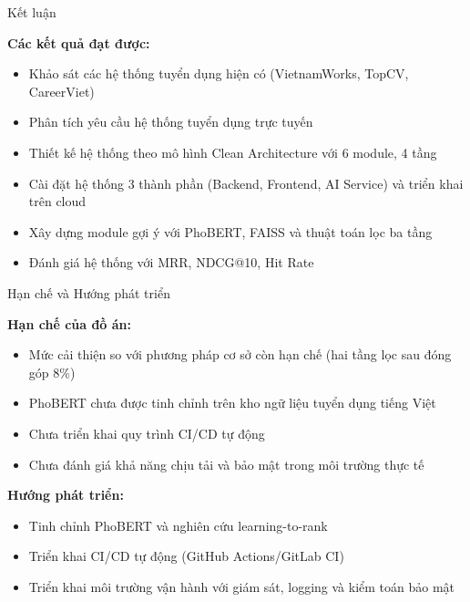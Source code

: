 \documentclass[aspectratio=169,xcolor=dvipsnames, t]{beamer}
\begin{document}
\begin{frame}{Kết luận}
\justifying

\textbf{Các kết quả đạt được:}

\begin{itemize}
    \item Khảo sát các hệ thống tuyển dụng hiện có (VietnamWorks, TopCV, CareerViet)

    \item Phân tích yêu cầu hệ thống tuyển dụng trực tuyến

    \item Thiết kế hệ thống theo mô hình Clean Architecture với 6 module, 4 tầng

    \item Cài đặt hệ thống 3 thành phần (Backend, Frontend, AI Service) và triển khai trên cloud

    \item Xây dựng module gợi ý với PhoBERT, FAISS và thuật toán lọc ba tầng

    \item Đánh giá hệ thống với MRR, NDCG@10, Hit Rate
\end{itemize}

\end{frame}

\begin{frame}{Hạn chế và Hướng phát triển}
\justifying

\textbf{Hạn chế của đồ án:}

\begin{itemize}
    \item Mức cải thiện so với phương pháp cơ sở còn hạn chế (hai tầng lọc sau đóng góp 8\%)

    \item PhoBERT chưa được tinh chỉnh trên kho ngữ liệu tuyển dụng tiếng Việt

    \item Chưa triển khai quy trình CI/CD tự động

    \item Chưa đánh giá khả năng chịu tải và bảo mật trong môi trường thực tế
\end{itemize}

\vspace{0.3cm}
\textbf{Hướng phát triển:}

\begin{itemize}
    \item Tinh chỉnh PhoBERT và nghiên cứu learning-to-rank

    \item Triển khai CI/CD tự động (GitHub Actions/GitLab CI)

    \item Triển khai môi trường vận hành với giám sát, logging và kiểm toán bảo mật
\end{itemize}

\end{frame}

\makefinalpage

\end{document}
